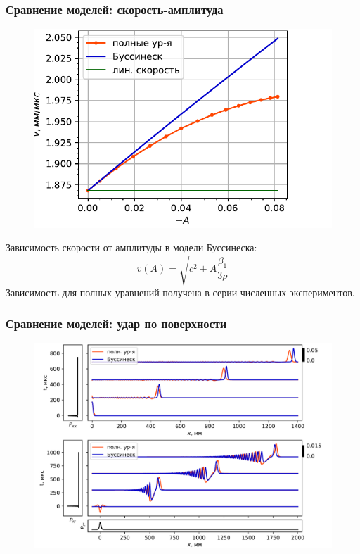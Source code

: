 \documentclass{beamer}
\DeclareMathOperator{\erf}{erf}
\newcommand{\lb}{\left (}
\newcommand{\rb}{\right )}
\newcommand{\pdiff}[2]{\frac{\partial #1}{\partial #2}}
\begin{document}
\begin{frame} \frametitle{Сравнение моделей: скорость-амплитуда}
\begin{figure}
	\includegraphics[width=\linewidth]{figures/VelAmplColor}
\end{figure}
Зависимость скорости от амплитуды в модели Буссинеска:
\begin{equation}\nonumber
v(A) = \sqrt{c^2 + A\frac{\beta_1}{3\rho}}
\end{equation}
Зависимость для полных уравнений получена в серии численных экспериментов.
\end{frame}


\begin{frame} \frametitle{Сравнение моделей: удар по поверхности}
\begin{figure}[h]
	\centering
	\includegraphics[width=.93\linewidth]{figures/Impact2Color}
\end{figure}
\end{frame}
\end{document}
